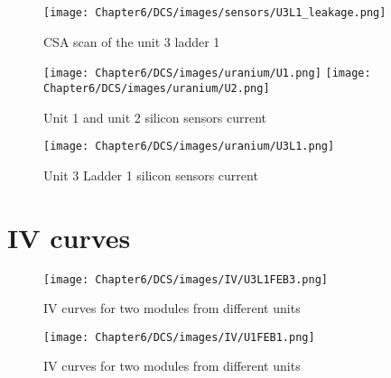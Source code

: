 \begin{figure}[h!]
\centering
\texttt{[image: Chapter6/DCS/images/sensors/U3L1\_leakage.png]}
\caption{CSA scan of the unit 3 ladder 1}
\label{U3L0CSABIAS}
\end{figure}





\begin{figure}[h!]
\centering
\texttt{[image: Chapter6/DCS/images/uranium/U1.png]}
\texttt{[image: Chapter6/DCS/images/uranium/U2.png]}
\caption{Unit 1 and unit 2 silicon sensors current}
\label{fig_U1U2}
\end{figure}

\begin{figure}[h!]
\centering
\texttt{[image: Chapter6/DCS/images/uranium/U3L1.png]}
\caption{Unit 3 Ladder 1 silicon sensors current}
\label{fig_U3L1}
\end{figure}
\chapter{IV curves}
\label{IV}

\begin{figure}[h!]
\centering
\texttt{[image: Chapter6/DCS/images/IV/U3L1FEB3.png]}
\caption{IV curves for two modules from different units}
\label{fig_U3L1}
\end{figure}

\begin{figure}[h!]
\centering
\texttt{[image: Chapter6/DCS/images/IV/U1FEB1.png]}
\caption{IV curves for two modules from different units}
\label{fig_U3L1}
\end{figure}
